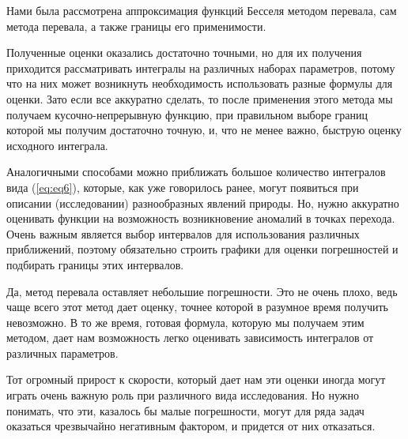 \documentclass[14pt]{extarticle}
\begin{document}
Нами была рассмотрена аппроксимация функций Бесселя методом перевала, сам метода перевала, а также границы его применимости. 

Полученные оценки оказались достаточно точными, но для их получения приходится рассматривать интегралы на различных наборах параметров, потому что на них может возникнуть необходимость использовать разные формулы для оценки. Зато если все аккуратно сделать, то после применения этого метода мы получаем кусочно-непрерывную функцию, при правильном выборе границ которой мы получим достаточно точную, и, что не менее важно, быструю оценку исходного интеграла.

Аналогичными способами можно приближать большое количество интегралов вида (\ref{eq:eq6}), которые, как уже говорилось ранее, могут появиться при описании (исследовании) разнообразных явлений природы. Но, нужно аккуратно оценивать функции на возможность возникновение аномалий в точках перехода. Очень важным является выбор интервалов для использования различных приближений, поэтому обязательно строить графики для оценки погрешностей и подбирать границы этих интервалов. 

Да, метод перевала оставляет небольшие погрешности. Это не очень плохо, ведь чаще всего этот метод  дает оценку, точнее которой в разумное время получить невозможно. В то же время, готовая формула, которую мы получаем этим методом, дает нам возможность легко оценивать зависимость интегралов от различных параметров. 

Тот огромный прирост к скорости, который дает нам эти оценки иногда могут играть очень важную роль при различного вида исследования. Но нужно понимать, что эти, казалось бы малые погрешности, могут для ряда задач оказаться чрезвычайно негативным фактором, и придется от них отказаться.
 
\newpage
\end{document}
